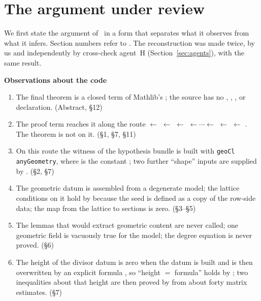 \section{The argument under review}
\label{sec:argument}

We first state the argument of \N\ in a form that separates what it observes from what it infers. Section numbers refer to \N.
The reconstruction was made twice, by us and independently by cross-check agent~H (Section~\ref{sec:agents}), with the same result.

\begin{notebox}
\textbf{Observations about the code}
\begin{enumerate}[label=(A\arabic*),leftmargin=3.2em]
\item The final theorem is a closed term of Mathlib's ; the source has no , , ,  or  declaration. \hfill (Abstract, \S12)
\item The proof term reaches it along the route  $\leftarrow$  $\leftarrow$  $\leftarrow$  $\leftarrow\cdots\leftarrow$
 $\leftarrow$  $\leftarrow$ . The theorem  is not on it. \hfill (\S1, \S7, \S11)
\item On this route the witness of the hypothesis bundle  is built with \texttt{geoCl anyGeometry}, where  is the constant ; two further ``shape'' inputs are supplied by . \hfill (\S2, \S7)
\item The geometric datum is assembled from a degenerate model; the lattice conditions on it hold by  because the seed is defined as a copy of the row-side data; the map from the lattice to sections is zero. \hfill (\S3--\S5)
\item The lemmas that would extract geometric content are never called; one geometric field is vacuously true for the model; the degree equation is never proved. \hfill (\S6)
\item The height of the divisor datum is zero when the datum is built and is then overwritten by an explicit formula , so ``height $=$ formula'' holds by ;
two inequalities about that height are then proved by  from about forty matrix estimates. \hfill (\S7)
\end{enumerate}

\end{notebox}
